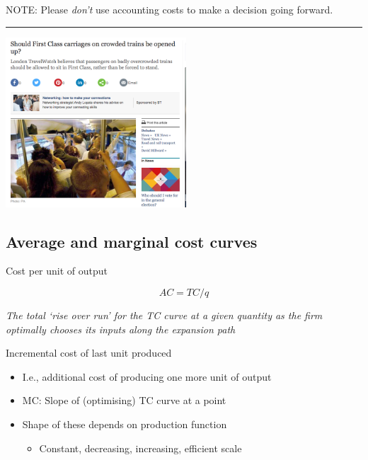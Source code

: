 \documentclass[]{article}
\providecommand{\tightlist}{%
  \setlength{\itemsep}{0pt}\setlength{\parskip}{0pt}}
\begin{document}
NOTE: Please \emph{don't} use accounting costs to make a decision going forward.

\begin{center}\rule{0.5\linewidth}{\linethickness}\end{center}

\includegraphics[height=2.5in]{picsfigs/firstclass.png}

\hypertarget{average-and-marginal-cost-curves}{%
\subsection{Average and marginal cost curves}\label{average-and-marginal-cost-curves}}

\begin{description}
\tightlist
\item[Average cost]
Cost per unit of output
\end{description}

\[AC=TC/q\]

\emph{The total `rise over run' for the TC curve at a given quantity as the firm optimally chooses its inputs along the expansion path}

\begin{description}
\tightlist
\item[Marginal cost]
Incremental cost of last unit produced
\end{description}

\begin{itemize}
\item
  I.e., additional cost of producing one more unit of output
\item
  MC: Slope of (optimising) TC curve at a point
\item
  Shape of these depends on production function

  \begin{itemize}
  \tightlist
  \item
    Constant, decreasing, increasing, efficient scale
  \end{itemize}
\end{itemize}
\end{document}
